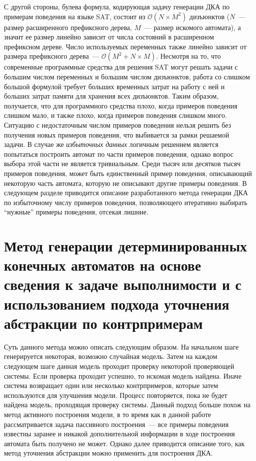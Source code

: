 С другой стороны, булева формула, кодирующая задачу генерации ДКА по примерам поведения на языке SAT, состоит из $\mathcal{O}\left(N \times M^2\right)$ дизъюнктов ($N$~--- размер расширенного префиксного дерева, $M$~--- размер искомого автомата), а значит ее размер линейно зависит от числа состояний в расширенном префиксном дереве.
Число используемых переменных также линейно зависит от размера префиксного дерева~--- $\mathcal{O}(M^2 + N \times M)$.
Несмотря на то, что современные программные средства для решения SAT могут решать задачи с большим числом переменных и большим числом дизъюнктов, работа со слишком большой формулой требует больших временных затрат на работу с ней и больших затрат памяти для хранения всех дизъюнктов.
Таким образом, получается, что для программного средства плохо, когда примеров поведения слишком мало, и также плохо, когда примеров поведения слишком много.
Ситуацию с недостаточным числом примеров поведения нельзя решить без получения новых примеров поведения, что выбивается за рамки решаемой задачи.
В случае же \emph{избыточных данных} логичным решением является попытаться построить автомат по части примеров поведения, однако вопрос выбора этой части не является тривиальным.
Среди тысяч или десятков тысяч примеров поведения, может быть единственный пример поведения, описывающий некоторую часть автомата, которую не описывают другие примеры поведения.
В следующем разделе приводится описание разработанного метода генерации ДКА по избыточному числу примеров поведения, позволяющего итеративно выбирать ``нужные'' примеры поведения, отсекая лишние.

\section{Метод генерации детерминированных конечных автоматов на основе сведения к задаче выполнимости и с использованием подхода уточнения абстракции по контрпримерам}
\label{sec:cegar:cegar-algo}

Суть данного метода можно описать следующим образом.
На начальном шаге генерируется некоторая, возможно случайная модель.
Затем на каждом следующем шаге данная модель проходит проверку некоторой проверяющей системы. Если проверка проходит успешно, то искомая модель найдена.
Иначе система возвращает один или несколько контрпримеров, которые затем используются для улучшения модели.
Процесс повторяется, пока не будет найдена модель, проходящая проверку системы.
Данный подход больше похож на метод активного построения модели, в то время как в данной работе рассматривается задача пассивного построения~--- все примеры поведения известны заранее и никакой дополнительной информации в ходе построения автомата быть получено не может.
Однако далее приводится описание того, как метод уточнения абстракции можно применить для построения ДКА.

